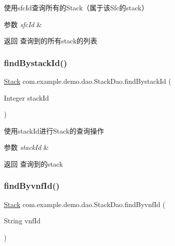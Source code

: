 使用sfc\+Id查询所有的\+Stack（属于该\+Sfc的stack） 
\begin{DoxyParams}{参数}
{\em sfc\+Id} & \\
\hline
\end{DoxyParams}
\begin{DoxyReturn}{返回}
查询到的所有stack的列表 
\end{DoxyReturn}
\mbox{\label{interfacecom_1_1example_1_1demo_1_1dao_1_1_stack_dao_a4f7310088b8fdccdcc0084d8f2f75a9e}} 
\subsubsection{\texorpdfstring{find\+Bystack\+Id()}{findBystackId()}}
{\footnotesize\ttfamily \mbox{\hyperlink{classcom_1_1example_1_1demo_1_1modular_1_1_stack}{Stack}} com.\+example.\+demo.\+dao.\+Stack\+Dao.\+find\+Bystack\+Id (\begin{DoxyParamCaption}\item[{Integer}]{stack\+Id }\end{DoxyParamCaption})}

使用stack\+Id进行\+Stack的查询操作 
\begin{DoxyParams}{参数}
{\em stack\+Id} & \\
\hline
\end{DoxyParams}
\begin{DoxyReturn}{返回}
查询到的stack 
\end{DoxyReturn}
\mbox{\label{interfacecom_1_1example_1_1demo_1_1dao_1_1_stack_dao_a6b21413e546df384f540a650c936f676}} 
\subsubsection{\texorpdfstring{find\+Byvnf\+Id()}{findByvnfId()}}
{\footnotesize\ttfamily \mbox{\hyperlink{classcom_1_1example_1_1demo_1_1modular_1_1_stack}{Stack}} com.\+example.\+demo.\+dao.\+Stack\+Dao.\+find\+Byvnf\+Id (\begin{DoxyParamCaption}\item[{String}]{vnf\+Id }\end{DoxyParamCaption})}


